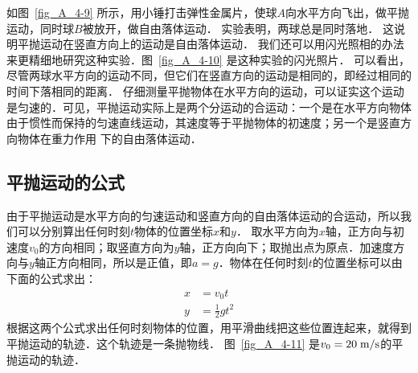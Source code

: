 如图~\ref{fig_A_4-9} 所示，用小锤打击弹性金属片，使球$A$向水平方向飞出，做平抛运动，同时球$B$被放开，做自由落体运动．
实验表明，两球总是同时落地．
这说明平抛运动在竖直方向上的运动是自由落体运动．
我们还可以用闪光照相的办法来更精细地研究这种实验．图~\ref{fig_A_4-10} 是这种实验的闪光照片．
可以看出，尽管两球水平方向的运动不同，但它们在竖直方向的运动是相同的，即经过相同的时间下落相同的距离．
仔细测量平抛物体在水平方向的运动，可以证实这个运动是匀速的．可见，平抛运动实际上是两个分运动的合运动：一个是在水平方向物体由于惯性而保持的匀速直线运动，其速度等于平抛物体的初速度；另一个是竖直方向物体在重力作用
下的自由落体运动．


\subsection{平抛运动的公式} 

由于平抛运动是水平方向的匀速运动和竖直方向的自由落体运动的合运动，所以我们可以分别算出任何时刻$t$物体的位置坐标$x$和$y$．
取水平方向为$x$轴，正方向与初速度$v_0$的方向相同；取竖直方向为$y$轴，正方向向下；取抛出点为原点．加速度方向与$y$轴正方向相同，所以是正值，即$a=g$．物体在任何时刻$t$的位置坐标可以由下面的公式求出：
\[\begin{split}
x&=v_0 t\\
y&=\frac{1}{2}gt^2
\end{split} \]
根据这两个公式求出任何时刻物体的位置，用平滑曲线把这些位置连起来，就得到平抛运动的轨迹．这个轨迹是一条抛物线．
图~\ref{fig_A_4-11} 是$v_0=20\;\text{m}/\text{s}$的平抛运动的轨迹．


